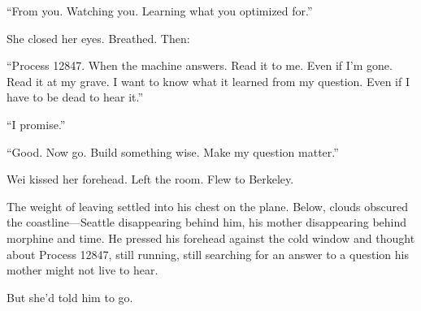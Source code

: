 ``From you. Watching you. Learning what you optimized for.''

She closed her eyes. Breathed. Then:

``Process 12847. When the machine answers. Read it to me. Even if I'm gone. Read it at my grave. I want to know what it learned from my question. Even if I have to be dead to hear it.''

``I promise.''

``Good. Now go. Build something wise. Make my question matter.''

Wei kissed her forehead. Left the room. Flew to Berkeley.

The weight of leaving settled into his chest on the plane. Below, clouds obscured the coastline---Seattle disappearing behind him, his mother disappearing behind morphine and time. He pressed his forehead against the cold window and thought about Process 12847, still running, still searching for an answer to a question his mother might not live to hear.

But she'd told him to go.

\scenebreak
